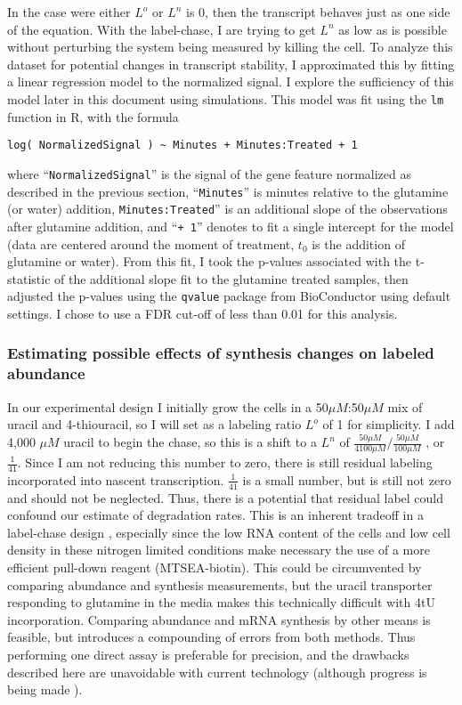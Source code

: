 In the case were either \(L^o\) or \(L^n\) is 0, then the transcript
behaves just as one side of the equation. With the label-chase, I are
trying to get \(L^n\) as low as is possible without perturbing the
system being measured by killing the cell.
To analyze this dataset for potential changes in transcript stability,
I approximated this by fitting a linear regression model to the
normalized signal. I explore the sufficiency of this model later in
this document using simulations. This model was fit using the
\texttt{lm} function in R, with the formula

\begin{verbatim}
log( NormalizedSignal ) ~ Minutes + Minutes:Treated + 1
\end{verbatim}

where ``\texttt{NormalizedSignal}'' is the signal of the gene feature
normalized as described in the previous section, ``\texttt{Minutes}'' is
minutes relative to the glutamine (or water) addition,
\texttt{Minutes:Treated}'' is an additional slope of the observations
after glutamine addition, and ``\texttt{+\ 1}'' denotes to fit a single
intercept for the model (data are centered around the moment of 
treatment, $t_0$ is the addition of glutamine or water). 
From this fit, I took the p-values associated
with the t-statistic of the additional slope fit to the glutamine
treated samples, then adjusted the p-values using the \texttt{qvalue}
package from BioConductor using default settings. I chose to use a FDR
cut-off of less than 0.01 for this analysis.

\subsubsection{Estimating possible effects of synthesis changes on 
labeled abundance}

In our experimental design I initially grow the cells in a
50\(\mu M\):50\(\mu M\) mix of uracil and 4-thiouracil, so I will set
as a labeling ratio \(L^o\) of 1 for simplicity. I add 4,000 \(\mu M\)
uracil to begin the chase, so this is a shift to a \(L^n\) of
\(\frac{50 \mu M}{4100 \mu M} / \frac{50 \mu M}{100 \mu M}\) , or
\(\frac{1}{41}\). Since I am not reducing this number to zero, there
is still residual labeling incorporated into nascent transcription.
\(\frac{1}{41}\) is a small number, but is still not zero and should
not be neglected.
Thus, there is a potential that residual label could confound our
estimate of degradation rates. This is an inherent tradeoff in a
label-chase design \parencite{perez2013eukaryotic}, 
especially since the low RNA content of the cells
and low cell density in these nitrogen limited conditions make necessary
the use of a more efficient pull-down reagent (MTSEA-biotin). This could
be circumvented by comparing abundance and synthesis measurements, but
the uracil transporter responding to glutamine in the media makes this
technically difficult with 4tU incorporation. Comparing abundance and
mRNA synthesis by other means is feasible, but introduces a compounding
of errors from both methods. Thus performing one direct assay is
preferable for precision, and the drawbacks described here are
unavoidable with current technology (although progress is being made
\parencite{chan2017non}).


